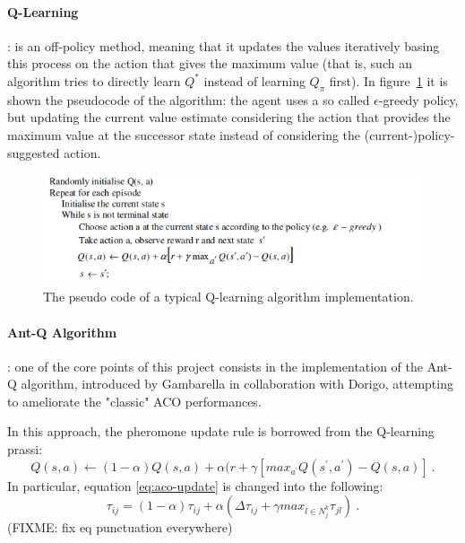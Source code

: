 \paragraph{Q-Learning}: 
is  an  off-policy  method, meaning  that  it updates the values  iteratively basing this process on  the  action that  gives  the  maximum  value  (that is, such an algorithm tries to directly  learn $Q^*$  instead  of  learning $Q_\pi$ first). In figure~\ref{fig:q_pseudo} it is shown the pseudocode of the algorithm:  the  agent  uses  a  so called $\epsilon$-greedy  policy,  but  updating the  current  value  estimate  considering the  action  that  provides  the  maximum  value  at  the successor state instead of considering the (current-)policy-suggested action. 
\begin{figure}
\includegraphics[scale=0.6]{figs/q_pseudo.png}
\caption{\label{fig:q_pseudo} The pseudo code of a typical Q-learning algorithm implementation.}
\end{figure}

\paragraph{Ant-Q Algorithm}:
one of the core points of this project consists in the implementation of the Ant-Q algorithm, introduced by Gambarella \cite{undici} in collaboration with Dorigo, attempting to ameliorate the "classic" ACO performances.  

In this approach, the pheromone update rule  is borrowed from the Q-learning prassi:
\begin{equation}
Q(s,a) \leftarrow (1-\alpha) Q(s,a) + \alpha (r + \gamma [max_{a^{'}} Q(s^{'},a^{'})-Q(s,a)]~.
\label{eq:q-eq}
\end{equation}
In particular, equation \ref{eq:aco-update} is changed into the following: 
\begin{equation}
\tau_{ij}= (1-\alpha) \tau_{ij} + \alpha( \Delta \tau_{ij} + \gamma max_{l\in N^k_j}\tau_{jl}) ~.
\label{eq:antq-eq}
\end{equation} 
(FIXME: fix eq punctuation everywhere)

